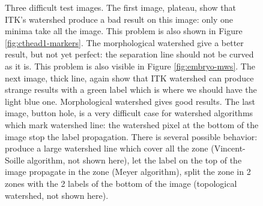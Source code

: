 \documentclass{InsightArticle}
\begin{document}
\begin{figure}[htbp]
\begin{center}
\caption{Three difficult test images. The first image, plateau, show that ITK's watershed produce a bad result on this image: only one minima take all the image. This problem is also shown in Figure \ref{fig:cthead1-markers}. The morphological watershed give a better result, but not yet perfect: the separation line should not be curved as it is. This problem is also visible in Figure \ref{fig:embryo-mws}. The next image, thick line, again show that ITK watershed can produce strange results with a green label which is where we should have the light blue one. Morphological watershed gives good results. The last image, button hole, is a very difficult case for watershed algorithms which mark watershed line: the watershed pixel at the bottom of the image stop the label propagation. There is several possible behavior: produce a large watershed line which cover all the zone (Vincent-Soille algorithm, not shown here), let the label on the top of the image propagate in the zone (Meyer algorithm), split the zone in 2 zones with the 2 labels of the bottom of the image (topological watershed, not shown here).\label{fig:difficult-cases}}
\end{center}
\end{figure}
\end{document}
